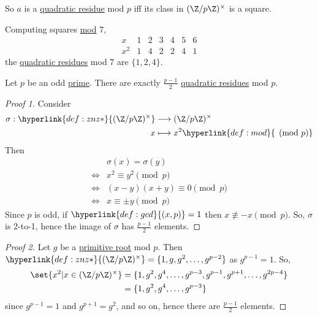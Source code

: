 \documentclass{article}
\begin{document}

So $a$ is a \hyperlink{def:qr}{quadratic residue} mod $p$ iff its class in $(\Z / p \Z)^\times$ is a square.
\begin{eg}
    Computing squares \hyperlink{def:mod}{mod} $7$,
    \begin{equation*}
        \begin{array}{c|cccccc}
            x & 1 & 2 & 3 & 4 & 5 & 6 \\ \hline
            x^2 & 1 & 4 & 2 & 2 & 4 & 1
        \end{array}
    \end{equation*}
    the \hyperlink{def:qr}{quadratic residues} mod $7$ are $\{1, 2, 4\}$.
\end{eg}

\begin{nlemma}\label{lem:3.1}
    Let $p$ be an odd \hyperlink{def:prime}{prime}. There are exactly $\frac{p-1}{2}$ \hyperlink{def:qr}{quadratic residues} mod $p$.
\end{nlemma}

\begin{proof}[Proof 1]
    Consider
    \begin{align*}
        \sigma: \hyperlink{def:znz*}{(\Z / p \Z)^\times} &\longrightarrow (\Z/p\Z)^\times \\
        x &\longmapsto x^2 \hyperlink{def:mod}{\pmod{p}}
    \end{align*}
    Then
    \begin{align*}
        &\sigma(x) = \sigma(y) \\
        \iff &x^2 \equiv y^2 \pmod{p} \\
        \iff &(x-y)(x+y) \equiv 0 \pmod{p} \\
        \iff &x \equiv \pm y \pmod{p}
    \end{align*}
    Since $p$ is odd, if $\hyperlink{def:gcd}{(x, p)} = 1$ then $x \not\equiv -x \pmod{p}$.
    So, $\sigma$ is 2-to-1, hence the image of $\sigma$ has $\frac{p-1}{2}$ elements.
\end{proof}

\begin{proof}[Proof 2]
    Let $g$ be a \hyperlink{def:primRoot}{primitive root} mod $p$.
    Then $\hyperlink{def:znz*}{(\Z / p \Z)^\times} = \{1, g, g^2, \dotsc, g^{p-2}\}$ as $g^{p-1} = 1$.
    So,
    \begin{align*}
        \set{x^2 | x \in (\Z / p\Z)^\times} &= \{1, g^2, g^4, \dotsc, g^{p-3}, g^{p-1}, g^{p+1}, \dotsc, g^{2p-4}\} \\
                                      &= \{1, g^2, g^4, \dotsc, g^{p-3}\}
    \end{align*}
    since $g^{p-1} = 1$ and $g^{p+1} = g^2$, and so on, hence there are $\frac{p-1}{2}$ elements.
\end{proof}
\end{document}
